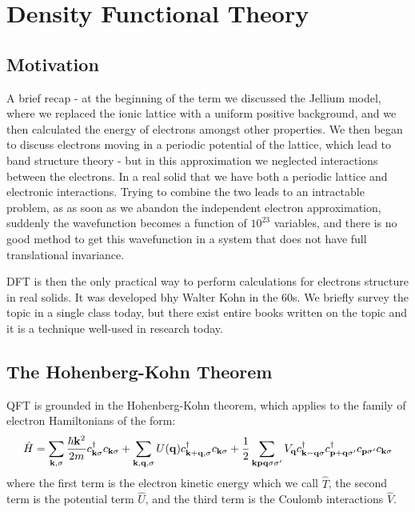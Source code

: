 \section{Density Functional Theory}

\subsection{Motivation}
A brief recap - at the beginning of the term we discussed the Jellium model, where we replaced the ionic lattice with a uniform positive background, and we then calculated the energy of electrons amongst other properties. We then began to discuss electrons moving in a periodic potential of the lattice, which lead to band structure theory - but in this approximation we neglected interactions between the electrons. In a real solid that we have both a periodic lattice and electronic interactions. Trying to combine the two leads to an intractable problem, as as soon as we abandon the independent electron approximation, suddenly the wavefunction becomes a function of $10^{23}$ variables, and there is no good method to get this wavefunction in a system that does not have full translational invariance.

DFT is then the only practical way to perform calculations for electrons structure in real solids. It was developed bhy Walter Kohn in the 60s. We briefly survey the topic in a single class today, but there exist entire books written on the topic and it is a technique well-used in research today.

\subsection{The Hohenberg-Kohn Theorem}

QFT is grounded in the Hohenberg-Kohn theorem, which applies to the family of electron Hamiltonians of the form:
\begin{equation}\label{eq-DFTHamiltonian}
    \hat{H} = \sum_{\mathbf{k}, \sigma} \frac{\hbar\mathbf{k}^2}{2m}c_{\mathbf{k}\sigma}^\dagger c_{\mathbf{k}\sigma} + \sum_{\mathbf{k}, \mathbf{q}, \sigma}U(\mathbf{q})c^\dagger_{\mathbf{k} + \mathbf{q}, \sigma}c_{\mathbf{k}\sigma} + \frac{1}{2}\sum_{\mathbf{k}\mathbf{p}\mathbf{q}\sigma\sigma'}V_{\mathbf{q}}c^\dagger_{\mathbf{k}-\mathbf{q}\sigma}c^\dagger_{\mathbf{p}+\mathbf{q}\sigma'}c_{\mathbf{p}\sigma'}c_{\mathbf{k}\sigma}
\end{equation}
where the first term is the electron kinetic energy which we call $\hat{T}$, the second term is the potential term $\hat{U}$, and the third term is the Coulomb interactions $\hat{V}$. 

